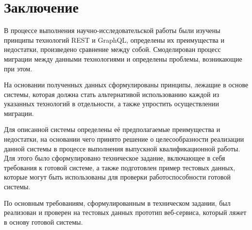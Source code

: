 \chapter*{Заключение} \label{ch-conclusion}

В процессе выполнения научно-исследовательской работы были изучены принципы технологий REST и GraphQL, определены их преимущества и недостатки, произведено сравнение между собой.
Смоделирован процесс миграции между данными технологиями и определены проблемы, возникающие при этом.

На основании полученных данных сформулированы принципы, лежащие в основе системы, которая должна стать альтернативой использованию каждой из указанных технологий в отдельности, а также упростить осуществлении миграции.

Для описанной системы определены её предполагаемые преимущества и недостатки, на основании чего принято решение о целесообразности реализации данной системы в процессе выполнения выпускной квалификационной работы.
Для этого было сформулировано техническое задание, включающее в себя требования к готовой системе, а также подготовлен пример тестовых данных, которые могут быть использованы для проверки работоспособности готовой системы.

По основным требованиям, сформулированным в техническом задании, был реализован и проверен на тестовых данных прототип веб-сервиса, который ляжет в основу готовой системы.
